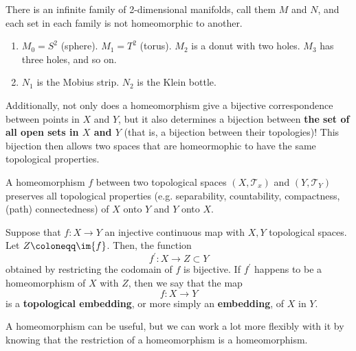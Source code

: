   \begin{example}
    There is an infinite family of 2-dimensional manifolds, call them $M$ and $N$, and each set in each family is not homeomorphic to another.  
    \begin{enumerate}
      \item $M_0 = S^2$ (sphere). $M_1 = T^2$ (torus). $M_2$ is a donut with two holes. $M_3$ has three holes, and so on. 
      \item $N_1$ is the Mobius strip. $N_2$ is the Klein bottle. 
    \end{enumerate}
  \end{example}

  Additionally, not only does a homeomorphism give a bijective correspondence between points in $X$ and $Y$, but it also determines a bijection between \textbf{the set of all open sets in $X$ and $Y$} (that is, a bijection between their topologies)! This bijection then allows two spaces that are homeormophic to have the same topological properties. 

  \begin{theorem}
    A homeomorphism $f$ between two topological spaces $(X, \mathscr{T}_{x})$ and $(Y, \mathscr{T}_{Y})$ preserves all topological properties (e.g. separability, countability, compactness, (path) connectedness) of $X$ onto $Y$ and $Y$ onto $X$. 
  \end{theorem}

  \begin{definition}[Embedding]
    Suppose that $f: X \longrightarrow Y$ an injective continuous map with $X, Y$ topological spaces. Let $Z \coloneqq \im{f}$. Then, the function
    \begin{equation}
      f^\prime: X \longrightarrow Z \subset Y
    \end{equation}
    obtained by restricting the codomain of $f$ is bijective. If $f^\prime$ happens to be a homeomorphism of $X$ with $Z$, then we say that the map
    \begin{equation}
      f: X \longrightarrow Y
    \end{equation}
    is a \textbf{topological embedding}, or more simply an \textbf{embedding}, of $X$ in $Y$. 
  \end{definition} 

  A homeomorphism can be useful, but we can work a lot more flexibly with it by knowing that the restriction of a homeomorphism is a homeomorphism. 

